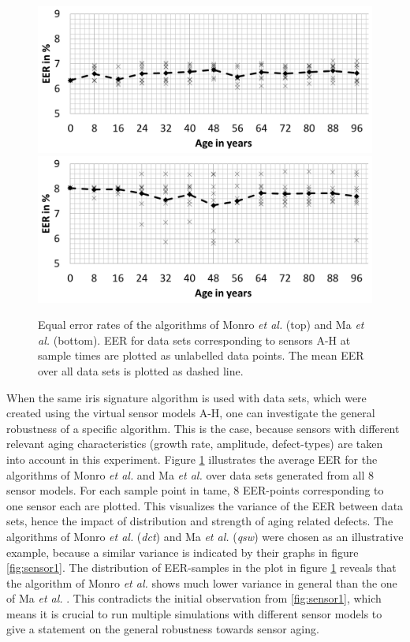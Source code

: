 \documentclass[10pt,twocolumn,letterpaper]{article}
\providecommand{\etal}[0]{\textit{et al.} }
\begin{document}
  \begin{figure}
  \centering
  \includegraphics[width=\linewidth]{img/dct.png}
  \includegraphics[width=\linewidth]{img/qsw.png}
  \caption{Equal error rates of the algorithms of Monro \etal (top) and Ma \etal \cite{Ma} (bottom). EER for data sets corresponding to sensors A-H at sample times are plotted as unlabelled data points. The mean EER over all data sets is plotted as dashed line.}
  \label{fig:allSensors}
\end{figure}
 
 When the same iris signature algorithm is used with data sets, which were created using the virtual sensor models A-H, one can investigate the general robustness of a specific algorithm. This is the case, because sensors with different relevant aging characteristics (growth rate, amplitude, defect-types) are taken into account in this experiment. Figure \ref{fig:allSensors} illustrates the average EER for the algorithms of Monro \etal and Ma \etal over data sets generated from all 8 sensor models. For each sample point in tame, 8 EER-points corresponding to one sensor each are plotted. This visualizes the variance of the EER between data sets, hence the impact of distribution and strength of aging related defects. The algorithms of Monro \etal (\emph{dct}) and Ma \etal (\emph{qsw}) were chosen as an illustrative example, because a similar variance is indicated by their graphs in figure \ref{fig:sensor1}. The distribution of EER-samples in the plot in figure \ref{fig:allSensors} reveals that the algorithm of Monro \etal shows much lower variance in general than the one of Ma \etal. This contradicts the initial observation from \ref{fig:sensor1}, which means it is crucial to run multiple simulations with different sensor models to give a statement on the general robustness towards sensor aging.
 
\end{document}
